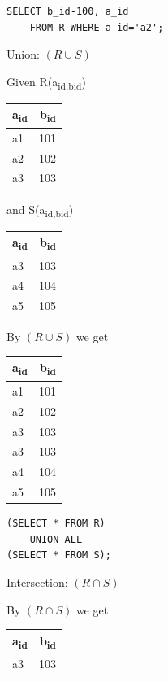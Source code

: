 \documentclass[11pt]{article}
\begin{document}
\begin{verbatim}
SELECT b_id-100, a_id
    FROM R WHERE a_id='a2';
\end{verbatim}

Union: \((R\cup S)\)

Given
R(a\textsubscript{id,b}\textsubscript{id})
\begin{center}
\begin{tabular}{lr}
a\textsubscript{id} & b\textsubscript{id}\\
\hline
a1 & 101\\
a2 & 102\\
a3 & 103\\
\end{tabular}
\end{center}
and S(a\textsubscript{id,b}\textsubscript{id})
\begin{center}
\begin{tabular}{lr}
a\textsubscript{id} & b\textsubscript{id}\\
\hline
a3 & 103\\
a4 & 104\\
a5 & 105\\
\end{tabular}
\end{center}

By \((R\cup S)\) we get
\begin{center}
\begin{tabular}{lr}
a\textsubscript{id} & b\textsubscript{id}\\
\hline
a1 & 101\\
a2 & 102\\
a3 & 103\\
a3 & 103\\
a4 & 104\\
a5 & 105\\
\end{tabular}
\end{center}

\begin{verbatim}
(SELECT * FROM R)
    UNION ALL
(SELECT * FROM S);
\end{verbatim}

Intersection: \((R\cap S)\)

By \((R\cap S)\) we get
\begin{center}
\begin{tabular}{lr}
a\textsubscript{id} & b\textsubscript{id}\\
\hline
a3 & 103\\
\end{tabular}
\end{center}
\end{document}
